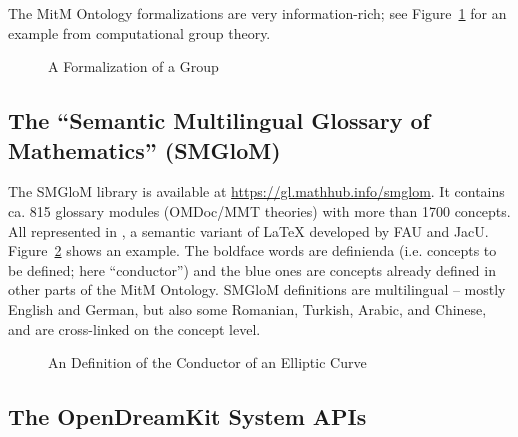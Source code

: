 \documentclass[book]{deliverablereport}
\begin{document}
The MitM Ontology formalizations are very information-rich; see Figure~\ref{fig:mitm1} for
an example from computational group theory. 

\begin{figure}[ht]\centering
  \caption{A Formalization of a Group}\label{fig:mitm1}
\end{figure}

\subsection{The ``Semantic Multilingual Glossary of Mathematics'' (SMGloM)}\label{sec:smglom}
The SMGloM library is available at \url{https://gl.mathhub.info/smglom}. It contains
ca. 815 glossary modules (OMDoc/MMT theories) with more than 1700 concepts. All
represented in \sTeX, a semantic variant of {\LaTeX} developed by FAU and
JacU. Figure~\ref{fig:conductor} shows an example. The boldface words are definienda
(i.e. concepts to be defined; here ``conductor'') and the blue ones are concepts already
defined in other parts of the MitM Ontology. SMGloM definitions are multilingual -- mostly
English and German, but also some Romanian, Turkish, Arabic, and Chinese, and are
cross-linked on the concept level.

\begin{figure}[ht]\centering
  \caption{An \sTeX Definition of the Conductor of an Elliptic
    Curve}\label{fig:conductor}
\end{figure}

\subsection{The OpenDreamKit System APIs}
\end{document}

